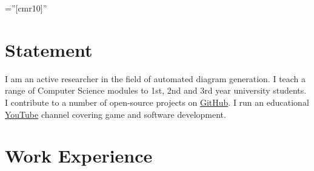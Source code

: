 \documentclass[a4paper,11pt]{article} %
\begin{document}
\pagestyle{empty} %

\font\fb=''[cmr10]'' %


\par{\bigskip\par} %

\section{Statement}

I am an active researcher in the field of automated diagram generation.
I teach a range of Computer Science modules to 1st, 2nd and 3rd year
university students.
I contribute to a number of open-source projects on \href{https://github.com/AlmasB}{GitHub}.
I run an educational \href{https://www.youtube.com/almasb0/videos}{YouTube} channel covering
game and software development.


\section{Work Experience}
\end{document}
